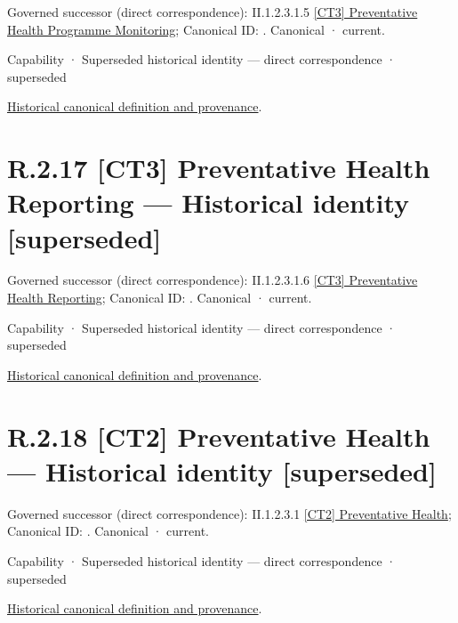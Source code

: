 {\small Governed successor (direct correspondence): II.1.2.3.1.5 \hyperref[element:945b40ced8004e1cbf7c98c731d17daf]{[CT3] Preventative Health Programme Monitoring}; Canonical ID: \texttt{}. Canonical · current.}\par
\label{element:e05f6310f6d544efaca5568604f27dd8}
{\small Capability · Superseded historical identity — direct correspondence · superseded}\par
\href{../../../../../../../continuum/strategy/capability/e05f6310f6d544efaca5568604f27dd8.md}{Historical canonical definition and provenance}.\par
\section*{R.2.17 [CT3] Preventative Health Reporting — Historical identity [superseded]}
\label{navigation:R.2.17}

{\small Governed successor (direct correspondence): II.1.2.3.1.6 \hyperref[element:d2ef01c4cab348df822e802ab084faae]{[CT3] Preventative Health Reporting}; Canonical ID: \texttt{}. Canonical · current.}\par
\label{element:4faef45b4ebe4fa69e57c3d81bfea05f}
{\small Capability · Superseded historical identity — direct correspondence · superseded}\par
\href{../../../../../../../continuum/strategy/capability/4faef45b4ebe4fa69e57c3d81bfea05f.md}{Historical canonical definition and provenance}.\par
\section*{R.2.18 [CT2] Preventative Health — Historical identity [superseded]}
\label{navigation:R.2.18}

{\small Governed successor (direct correspondence): II.1.2.3.1 \hyperref[element:81be04a2d58548a4aea94f9aae90feb6]{[CT2] Preventative Health}; Canonical ID: \texttt{}. Canonical · current.}\par
\label{element:80affa7bcd284ecbbcbc5092f8497ddf}
{\small Capability · Superseded historical identity — direct correspondence · superseded}\par
\href{../../../../../../../continuum/strategy/capability/80affa7bcd284ecbbcbc5092f8497ddf.md}{Historical canonical definition and provenance}.\par
